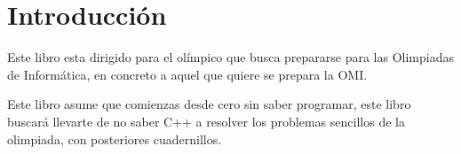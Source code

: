 \chapter*{Introducción}

Este libro esta dirigido para el olímpico que busca prepararse para las Olimpiadas de Informática, en concreto a aquel que quiere se prepara la OMI.

Este libro asume que comienzas desde cero sin saber programar, este libro buscará llevarte de no saber C++ a resolver los problemas sencillos de la olimpiada, con posteriores cuadernillos.

